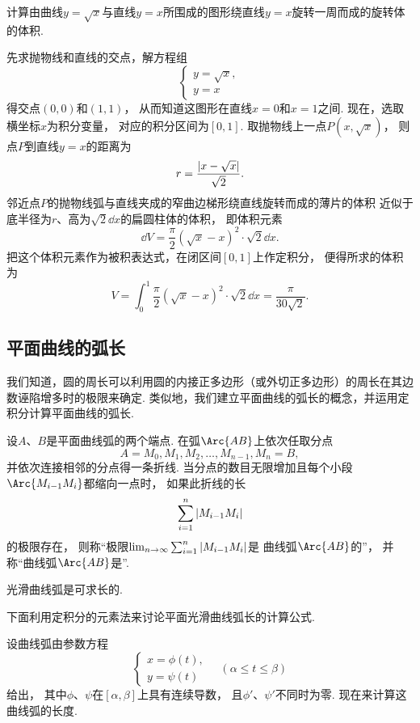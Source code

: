 \begin{example}
计算由曲线\(y=\sqrt{x}\)与直线\(y=x\)所围成的图形绕直线\(y=x\)旋转一周而成的旋转体的体积.
\begin{solution}
先求抛物线和直线的交点，解方程组\[
	\left\{ \begin{array}{l}
		y=\sqrt{x}, \\
		y=x
	\end{array} \right.
\]得交点\((0,0)\)和\((1,1)\)，
从而知道这图形在直线\(x=0\)和\(x=1\)之间.
现在，选取横坐标\(x\)为积分变量，
对应的积分区间为\([0,1]\).
取抛物线上一点\(P(x,\sqrt{x})\)，
则点\(P\)到直线\(y=x\)的距离为\[
	r = \frac{\abs{x-\sqrt{x}}}{\sqrt2}.
\]
邻近点\(P\)的抛物线弧与直线夹成的窄曲边梯形绕直线旋转而成的薄片的体积
近似于底半径为\(r\)、高为\(\sqrt2 \dd{x}\)的扁圆柱体的体积，
即体积元素\[
	\dd{V} = \frac\pi2 (\sqrt{x}-x)^2 \cdot \sqrt2 \dd{x}.
\]
把这个体积元素作为被积表达式，在闭区间\([0,1]\)上作定积分，
便得所求的体积为\[
	V = \int_0^1 \frac\pi2 (\sqrt{x}-x)^2 \cdot \sqrt2 \dd{x}
	= \frac\pi{30\sqrt2}.
\]
\end{solution}
\end{example}

\subsection{平面曲线的弧长}
我们知道，圆的周长可以利用圆的内接正多边形（或外切正多边形）的周长在其边数诬陷增多时的极限来确定.
类似地，我们建立平面曲线的弧长的概念，并运用定积分计算平面曲线的弧长.

设\(A\)、\(B\)是平面曲线弧的两个端点.
在弧\(\Arc{AB}\)上依次任取分点\[
	A=M_0,M_1,M_2,\dotsc,M_{n-1},M_n=B,
\]并依次连接相邻的分点得一条折线.
当分点的数目无限增加且每个小段\(\Arc{M_{i-1}M_i}\)都缩向一点时，
如果此折线的长\[
	\sum_{i=1}^n \abs{M_{i-1} M_i}
\]的极限存在，
则称“极限\(\lim_{n\to\infty} \sum_{i=1}^n \abs{M_{i-1} M_i}\)是
曲线弧\(\Arc{AB}\)的”，
并称“曲线弧\(\Arc{AB}\)是”.

\begin{theorem}
光滑曲线弧是可求长的.
\end{theorem}

下面利用定积分的元素法来讨论平面光滑曲线弧长的计算公式.

设曲线弧由参数方程\[
	\left\{ \begin{array}{l}
	x = \phi(t), \\
	y = \psi(t)
	\end{array} \right.
	\quad(\alpha \leq t \leq \beta)
\]给出，
其中\(\phi\)、\(\psi\)在\([\alpha,\beta]\)上具有连续导数，
且\(\phi'\)、\(\psi'\)不同时为零.
现在来计算这曲线弧的长度.

